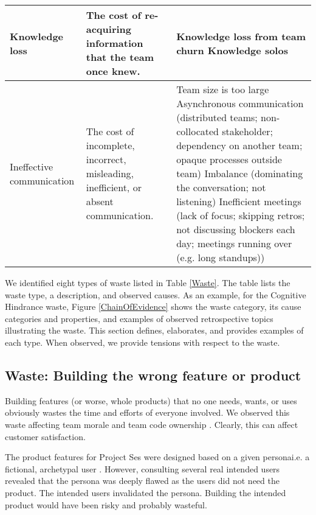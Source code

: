 \begin{table*}[t]
\begin{tabular}{|p{1.7in}|p{1.9in}|p{3in}|}
Knowledge loss & The cost of re-acquiring information that the team once knew. & 
Knowledge loss from team churn \newline
Knowledge solos \\ \hline
Ineffective communication             & The cost of incomplete, incorrect, misleading, inefficient, or absent communication.                         & 
Team size is too large \newline Asynchronous communication (distributed teams; non-collocated stakeholder; dependency on another team; opaque processes outside team) \newline Imbalance (dominating the conversation; not listening) \newline Inefficient meetings (lack of focus; skipping retros; not discussing blockers each day; meetings running over (e.g. long standups)) \\ \hline                  
\end{tabular}
\end{table*}








We identified eight types of waste listed in Table \ref{Waste}. The table lists the waste type, a description, and observed causes. As an example, for the Cognitive Hindrance waste, Figure \ref{ChainOfEvidence} shows the waste category, its cause categories and properties, and examples of observed retrospective topics illustrating the waste. This section defines, elaborates, and provides examples of each type. When observed, we provide tensions with respect to the waste.
\subsection{Waste: Building the wrong feature or product}
Building features (or worse, whole products) that no one needs, wants, or uses obviously wastes the time and efforts of everyone involved. We observed this waste affecting team morale and team code ownership \cite{SedanoTeamCodeOwnership}. Clearly, this can affect customer satisfaction. 


The product features for Project Ses were designed based on a given persona\textemdash i.e. a fictional, archetypal user \cite{Grudin2002personas}. However, consulting several real intended users revealed that the persona was deeply flawed as the users did not need the product. The intended users invalidated the persona. Building the intended product would have been risky and probably wasteful. 


